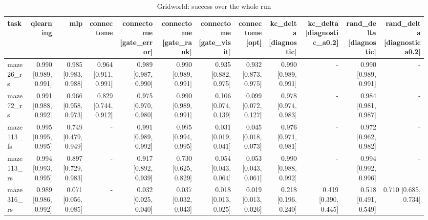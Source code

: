 \begin{table}[t]
\centering
\small
\begin{tabular}{lrrrrrrrrrrr}
\toprule
task & qlearning & mlp & connectome & connectome [gate\_error] & connectome [gate\_rank] & connectome [gate\_visit] & connectome [opt] & kc\_delta [diagnostic] & kc\_delta [diagnostic\_a0.2] & rand\_delta [diagnostic] & rand\_delta [diagnostic\_a0.2] \\
\midrule
maze26\_rs & 0.990 [0.989, 0.991] & 0.985 [0.983, 0.988] & 0.964 [0.911, 0.991] & 0.989 [0.987, 0.990] & 0.990 [0.989, 0.991] & 0.935 [0.882, 0.975] & 0.932 [0.873, 0.975] & 0.990 [0.989, 0.991] & - & 0.990 [0.989, 0.991] & - \\
maze72\_rs & 0.991 [0.988, 0.992] & 0.966 [0.958, 0.973] & 0.829 [0.744, 0.912] & 0.975 [0.970, 0.980] & 0.990 [0.989, 0.991] & 0.106 [0.074, 0.139] & 0.099 [0.072, 0.127] & 0.978 [0.974, 0.983] & - & 0.984 [0.981, 0.987] & - \\
maze113\_fs & 0.995 [0.995, 0.995] & 0.749 [0.479, 0.949] & - & 0.991 [0.989, 0.992] & 0.995 [0.994, 0.995] & 0.031 [0.019, 0.041] & 0.045 [0.018, 0.073] & 0.976 [0.971, 0.981] & - & 0.972 [0.962, 0.982] & - \\
maze113\_rs & 0.994 [0.993, 0.995] & 0.897 [0.729, 0.983] & - & 0.917 [0.892, 0.939] & 0.730 [0.625, 0.829] & 0.054 [0.043, 0.064] & 0.053 [0.043, 0.061] & 0.990 [0.988, 0.992] & - & 0.994 [0.992, 0.996] & - \\
maze316\_rs & 0.989 [0.986, 0.992] & 0.071 [0.056, 0.085] & - & 0.032 [0.025, 0.040] & 0.037 [0.032, 0.043] & 0.018 [0.013, 0.025] & 0.019 [0.013, 0.026] & 0.218 [0.196, 0.240] & 0.419 [0.390, 0.445] & 0.518 [0.491, 0.549] & 0.710 [0.685, 0.734] \\
\bottomrule
\end{tabular}
\caption{Gridworld: success over the whole run}
\label{tab:gridworld_overall_success}
\end{table}